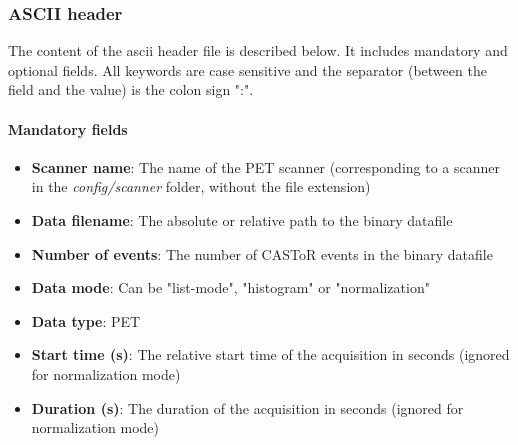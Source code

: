 \documentclass[a4paper, 11pt]{article}
\begin{document}
\subsubsection{ASCII header}

The content of the ascii header file is described below. It includes mandatory and optional fields. All keywords are case sensitive and the
separator (between the field and the value) is the colon sign ":".

\paragraph{Mandatory fields}
\begin{itemize}
  \item \textbf{Scanner name}: The name of the PET scanner (corresponding to a scanner in the \textit{config/scanner} folder, without
        the file extension)
  \item \textbf{Data filename}: The absolute or relative path to the binary datafile
  \item \textbf{Number of events}: The number of CASToR events in the binary datafile
  \item \textbf{Data mode}: Can be "list-mode", "histogram" or "normalization"
  \item \textbf{Data type}: PET
  \item \textbf{Start time (s)}: The relative start time of the acquisition in seconds (ignored for normalization mode)
  \item \textbf{Duration (s)}: The duration of the acquisition in seconds (ignored for normalization mode)
\end{itemize}
\end{document}

